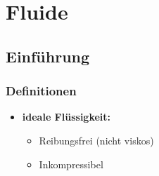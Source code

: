 
\newpage
\section{Fluide}
	\subsection{Einführung}
	\subsubsection{Definitionen}
		\begin{minipage}{19cm}
			\begin{itemize}
				\item \textbf{ideale Flüssigkeit:}
					\begin{itemize}
						\item Reibungsfrei (nicht viskos)
						\item Inkompressibel
					\end{itemize}
			\end{itemize}
		\end{minipage}
	\newline
	\newline
	
